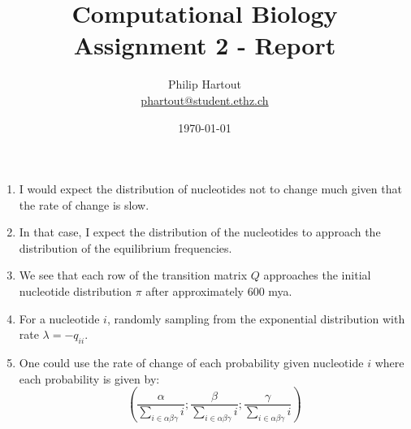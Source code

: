 \documentclass[a4paper,10pt,twoside]{article}
\title{Computational Biology \\ Assignment 2 - Report}
\author{Philip Hartout \\ \url{phartout@student.ethz.ch}}
\date{\today}
\begin{document}
\maketitle

\begin{enumerate}
    \item  I would expect the distribution of nucleotides not to change much given that the rate of change is slow. 
    \item  In that case, I expect the distribution of the nucleotides to approach the distribution of the equilibrium frequencies.
    \item  We see that each row of the transition matrix $Q$ approaches the initial nucleotide distribution $\pi$ after approximately 600 mya. 
    \item  For a nucleotide $i$, randomly sampling from the exponential distribution with rate $\lambda = -q_{ii}$.
    \item  One could use the rate of change of each probability given nucleotide $i$ where each probability is given by:
    \begin{equation*}
        \left(\frac{\alpha}{\sum_{i\in\alpha\beta\gamma} i};\frac{\beta}{\sum_{i\in\alpha\beta\gamma} i};\frac{\gamma}{\sum_{i\in\alpha\beta\gamma} i}\right)
    \end{equation*}
\end{enumerate}
\end{document}
